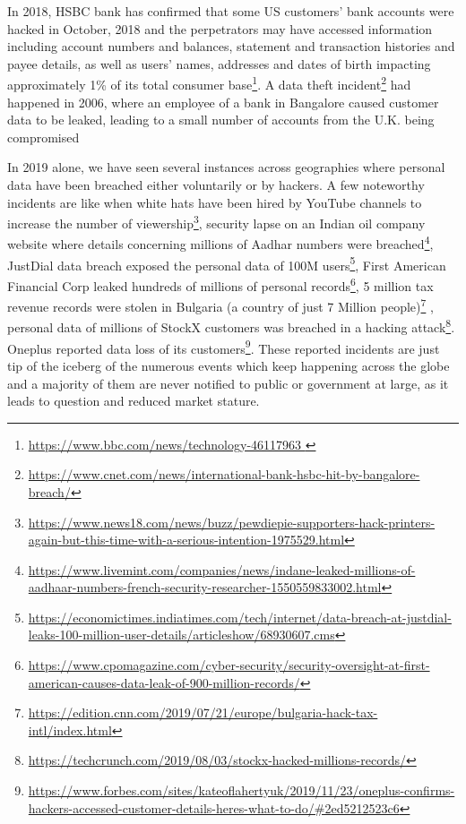 \begin{multicols}{2}
In 2018, HSBC bank has confirmed that some US customers' bank accounts were hacked in October, 2018 and the perpetrators may have accessed information including account numbers and balances, statement and transaction histories and payee details, as well as users' names, addresses and dates of birth impacting approximately 1\% of its total consumer base\footnote{\url{https://www.bbc.com/news/technology-46117963 }}. A data theft incident\footnote{\url{https://www.cnet.com/news/international-bank-hsbc-hit-by-bangalore-breach/}} had happened in 2006, where an employee of a bank in Bangalore caused customer data to be leaked, leading to a small number of accounts from the U.K. being compromised

In 2019 alone, we have seen several instances across geographies where personal data have been breached either voluntarily or by hackers. A few noteworthy \hbox{incidents} are like when white hats have been hired by YouTube channels to increase the number of viewership\footnote{\url{https://www.news18.com/news/buzz/pewdiepie-supporters-hack-printers-again-but-this-time-with-a-serious-intention-1975529.html}}, security lapse on an Indian oil company website where details concerning millions of Aadhar numbers were breached\footnote{\url{https://www.livemint.com/companies/news/indane-leaked-millions-of-aadhaar-numbers-french-security-researcher-1550559833002.html}}, JustDial data breach exposed the personal data of 100M users\footnote{\url{https://economictimes.indiatimes.com/tech/internet/data-breach-at-justdial-leaks-100-million-user-details/articleshow/68930607.cms}}, First American Financial Corp leaked hundreds of millions of personal records\footnote{\url{https://www.cpomagazine.com/cyber-security/security-oversight-at-first-american-causes-data-leak-of-900-million-records/}}, 5 million tax revenue records were stolen in Bulgaria (a country of just 7 Million people)\footnote{\url{https://edition.cnn.com/2019/07/21/europe/bulgaria-hack-tax-intl/index.html}} , personal data of millions of StockX customers was breached in a hacking attack\footnote{\url{https://techcrunch.com/2019/08/03/stockx-hacked-millions-records/}}. Oneplus reported data loss of its customers\footnote{\url{https://www.forbes.com/sites/kateoflahertyuk/2019/11/23/oneplus-confirms-hackers-accessed-customer-details-heres-what-to-do/\#2ed5212523c6}}. These reported incidents are just tip of the iceberg of the numerous events which keep happening across the globe and a majority of them are never notified to public or government at large, as it leads to question and reduced market stature.


\end{multicols}
